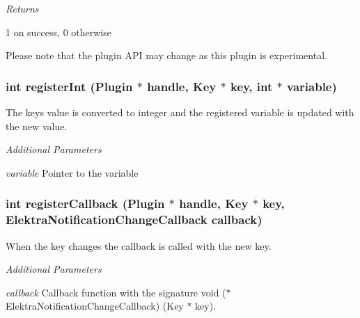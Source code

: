 {\itshape Returns}

1 on success, 0 otherwise

Please note that the plugin A\+PI may change as this plugin is experimental.

\subsubsection*{int register\+Int (Plugin $\ast$ handle, Key $\ast$ key, int $\ast$ variable)}

The key\textquotesingle{}s value is converted to integer and the registered variable is updated with the new value.

{\itshape Additional Parameters}


\begin{DoxyItemize}
\item {\itshape variable} Pointer to the variable
\end{DoxyItemize}

\subsubsection*{int register\+Callback (Plugin $\ast$ handle, Key $\ast$ key, Elektra\+Notification\+Change\+Callback callback)}

When the key changes the callback is called with the new key.

{\itshape Additional Parameters}


\begin{DoxyItemize}
\item {\itshape callback} Callback function with the signature {\ttfamily void ($\ast$\+Elektra\+Notification\+Change\+Callback) (Key $\ast$ key)}. 
\end{DoxyItemize}